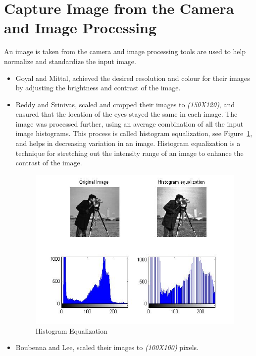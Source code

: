 \section{Capture Image from the Camera and Image Processing}
An image is taken from the camera and image processing tools are used to help normalize and standardize the input image.
\begin{itemize}

\item Goyal and Mittal, achieved the desired resolution and colour for their images by adjusting the brightness and contrast of the image\cite{1}.

\item Reddy and Srinivas, scaled and cropped their images to \textit{(150X120)}, and ensured that the location of the eyes stayed the same in each image. The image was processed further, using an average combination of all the input image histograms. This process is called histogram equalization, see Figure~\ref{fig:hist eq}, and helps in decreasing variation in an image. Histogram equalization is a technique for stretching out the intensity range of an image to enhance the contrast of the image\cite{2}.

\begin{figure}[ht]
  \centering
  \includegraphics[scale=0.4]{5}
  \caption{Histogram Equalization}
  \label{fig:hist eq}
\end{figure}

\item Boubenna and Lee, scaled their images to \textit{(100X100)} pixels\cite{3}.

\end{itemize}
